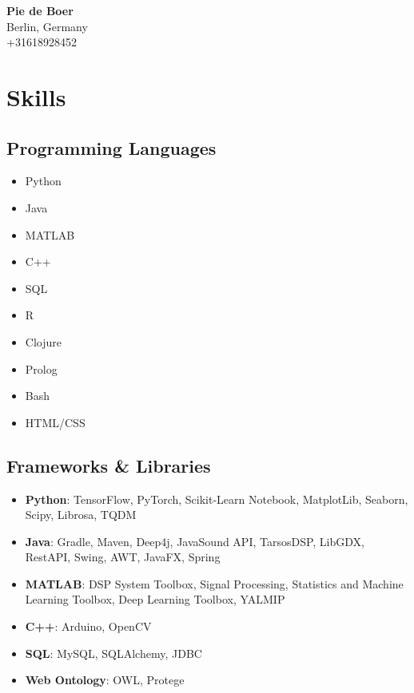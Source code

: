 \documentclass[a4paper,10pt]{article}
\newcommand{\name}[1]{{\LARGE\bfseries #1}}
\begin{document}
\begin{center}
    \name{Pie de Boer} \\
    Berlin, Germany \\
    +31618928452 \\
\end{center}

\section*{Skills}

\subsection*{Programming Languages}
\begin{itemize}[label={\faCode}]
    \item Python
    \item Java
    \item MATLAB
    \item C++
    \item SQL
    \item R
    \item Clojure
    \item Prolog
    \item Bash
    \item HTML/CSS
\end{itemize}

\subsection*{Frameworks \& Libraries}
\begin{itemize}[label={\faCogs}]
    \item \textbf{Python}: TensorFlow, PyTorch, Scikit-Learn Notebook, MatplotLib, Seaborn, Scipy, Librosa, TQDM
    \item \textbf{Java}: Gradle, Maven, Deep4j, JavaSound API, TarsosDSP, LibGDX, RestAPI, Swing, AWT, JavaFX, Spring
    \item \textbf{MATLAB}: DSP System Toolbox, Signal Processing, Statistics and Machine Learning Toolbox, Deep Learning Toolbox, YALMIP
    \item \textbf{C++}: Arduino, OpenCV
    \item \textbf{SQL}: MySQL, SQLAlchemy, JDBC
    \item \textbf{Web Ontology}: OWL, Protege
\end{itemize}
\end{document}
